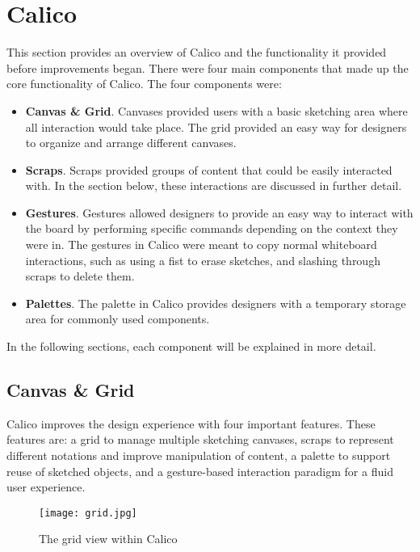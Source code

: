 \chapter{Calico}
This section provides an overview of Calico and the functionality it provided before improvements began. There were four main components that made up the core functionality of Calico. The four components were:

\begin{itemize}\itemsep1pt

\item
\textbf{Canvas \& Grid}. 
Canvases provided users with a basic sketching area where all interaction would take place. The grid provided an easy way for designers to organize and arrange different canvases.

\item
\textbf{Scraps}.
Scraps provided groups of content that could be easily interacted with. In the section below, these interactions are discussed in further detail.

\item
\textbf{Gestures}.
Gestures allowed designers to provide an easy way to interact with the board by performing specific commands depending on the context they were in. The gestures in Calico were meant to copy normal whiteboard interactions, such as using a fist to erase sketches, and slashing through scraps to delete them.

\item
\textbf{Palettes}.
The palette in Calico provides designers with a temporary storage area for commonly used components.


\end{itemize}

In the following sections, each component will be explained in more detail.


\section{Canvas \& Grid}

Calico improves the design experience with four important features. These features are: a grid to manage multiple sketching canvases, scraps to represent different notations and improve manipulation of content, a palette to support reuse of sketched objects, and a gesture-based interaction paradigm for a fluid user experience.


\begin{figure}[htb]
  \centering
  \texttt{[image: grid.jpg]}
  \caption{The grid view within Calico}
  \label{fig:grid}
\end{figure}

